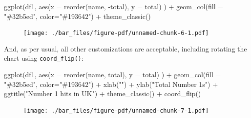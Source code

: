 \documentclass[
  letterpaper,
  DIV=11,
  numbers=noendperiod]{scrreprt}
\newenvironment{Shaded}{\begin{snugshade}}{\end{snugshade}}
\newcommand{\AttributeTok}[1]{\textcolor[rgb]{0.40,0.45,0.13}{#1}}
\newcommand{\FunctionTok}[1]{\textcolor[rgb]{0.28,0.35,0.67}{#1}}
\newcommand{\NormalTok}[1]{\textcolor[rgb]{0.00,0.23,0.31}{#1}}
\newcommand{\SpecialCharTok}[1]{\textcolor[rgb]{0.37,0.37,0.37}{#1}}
\newcommand{\StringTok}[1]{\textcolor[rgb]{0.13,0.47,0.30}{#1}}
\begin{document}
\begin{Shaded}
\begin{Highlighting}[]
\FunctionTok{ggplot}\NormalTok{(df1, }\FunctionTok{aes}\NormalTok{(}\AttributeTok{x =} \FunctionTok{reorder}\NormalTok{(name, }\SpecialCharTok{{-}}\NormalTok{total), }\AttributeTok{y =}\NormalTok{ total) ) }\SpecialCharTok{+} 
  \FunctionTok{geom\_col}\NormalTok{(}\AttributeTok{fill =} \StringTok{"\#32b5ed"}\NormalTok{, }\AttributeTok{color=}\StringTok{"\#193642"}\NormalTok{) }\SpecialCharTok{+}
  \FunctionTok{theme\_classic}\NormalTok{()}
\end{Highlighting}
\end{Shaded}

\begin{figure}[H]

{\centering \texttt{[image: ./bar\_files/figure-pdf/unnamed-chunk-6-1.pdf]}

}

\end{figure}

And, as per usual, all other customizations are acceptable, including
rotating the chart using \texttt{coord\_flip()}:

\begin{Shaded}
\begin{Highlighting}[]
\FunctionTok{ggplot}\NormalTok{(df1, }\FunctionTok{aes}\NormalTok{(}\AttributeTok{x =} \FunctionTok{reorder}\NormalTok{(name, total), }\AttributeTok{y =}\NormalTok{ total) ) }\SpecialCharTok{+} 
  \FunctionTok{geom\_col}\NormalTok{(}\AttributeTok{fill =} \StringTok{"\#32b5ed"}\NormalTok{, }\AttributeTok{color=}\StringTok{"\#193642"}\NormalTok{) }\SpecialCharTok{+}
  \FunctionTok{xlab}\NormalTok{(}\StringTok{""}\NormalTok{) }\SpecialCharTok{+}
  \FunctionTok{ylab}\NormalTok{(}\StringTok{"Total Number 1\textquotesingle{}s"}\NormalTok{) }\SpecialCharTok{+}
  \FunctionTok{ggtitle}\NormalTok{(}\StringTok{"Number 1 hits in UK"}\NormalTok{) }\SpecialCharTok{+}
  \FunctionTok{theme\_classic}\NormalTok{() }\SpecialCharTok{+}
  \FunctionTok{coord\_flip}\NormalTok{()}
\end{Highlighting}
\end{Shaded}

\begin{figure}[H]

{\centering \texttt{[image: ./bar\_files/figure-pdf/unnamed-chunk-7-1.pdf]}

}

\end{figure}
\end{document}
